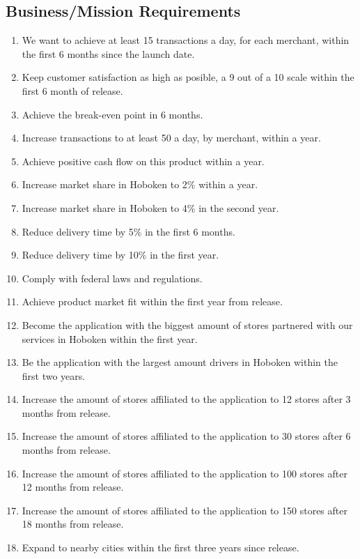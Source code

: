 \subsection{Business/Mission Requirements}
\begin{enumerate}[label=BR-\arabic*]
    \item We want to achieve at least 15 transactions a day, for each 
    merchant, within the first 6 months since the launch date.
    \item Keep customer satisfaction as high as posible, a 9 out of a 10 scale 
    within the first 6 month of release.
    \item Achieve the break-even point in 6 months.
    \item Increase transactions to at least 50 a day, by merchant, within 
    a year.
    \item Achieve positive cash flow on this product within a year.
    \item Increase market share in Hoboken to 2\% within a year.
    \item Increase market share in Hoboken to 4\% in the second year.
    \item Reduce delivery time by 5\% in the first 6 months.
    \item Reduce delivery time by 10\% in the first year.
    \item Comply with federal laws and regulations.
    \item Achieve product market fit \cite{product-market-fit} within the first 
    year from release.
    \item Become the application with the biggest amount of stores partnered 
    with our services in Hoboken within the first year.
    \item Be the application with the largest amount drivers in Hoboken 
    within the first two years.
    \item Increase the amount of stores affiliated to the application to 12 
    stores after 3 months from release.
    \item Increase the amount of stores affiliated to the application to 30 
    stores after 6 months from release.
    \item Increase the amount of stores affiliated to the application to 100 
    stores after 12 months from release.
    \item Increase the amount of stores affiliated to the application to 150 
    stores after 18 months from release.
    \item Expand to nearby cities within the first three years since release.

\end{enumerate}
